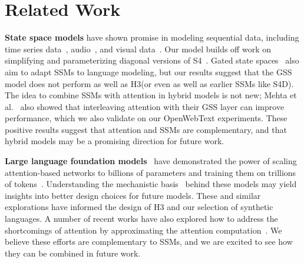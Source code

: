 \documentclass{article}
\newif\ifarxiv
\newcommand{\hthree}{\textsc{H3}\xspace}
\begin{document}
\ifarxiv
 \else

\fi


\appendix
\newpage


\section{Related Work}
\label{sec:related}

\textbf{State space models} have shown promise in modeling sequential data, including time series data~\citep{gu2022efficiently}, audio~\citep{goel2022s}, and visual data~\citep{nguyen2022s4nd}.
Our model builds off work on simplifying and parameterizing diagonal versions of S4~\citep{gu2022parameterization,gupta2022diagonal, gu2022train}.
Gated state spaces~\citep{mehta2022long} also aim to adapt SSMs to language modeling, but our results suggest that the GSS model does not perform as well as \hthree (or even as well as earlier SSMs like S4D).
The idea to combine SSMs with attention in hybrid models is not new; Mehta et al.~\citep{mehta2022long} also showed that interleaving attention with their GSS layer can improve performance, which we also validate on our OpenWebText experiments.
These positive results suggest that attention and SSMs are complementary, and that hybrid models may be a promising direction for future work.

\textbf{Large language foundation models}~\citep{bommasani2021opportunities} have demonstrated the power of scaling attention-based networks to billions of parameters and training them on trillions of tokens~\citep{hoffmann2022training}.
Understanding the mechanistic basis~\citep{elhage2021mathematical} behind these models may yield insights into better design choices for future models.
These and similar explorations have informed the design of \hthree and our selection of synthetic languages.
A number of recent works have also explored how to address the shortcomings of attention by approximating the attention computation~\citep{wang2020linformer,katharopoulos2020transformers, choromanski2020rethinking,tay2020long, kitaev2020reformer, daras2020smyrf}.
We believe these efforts are complementary to SSMs, and we are excited to see how they can be combined in future work.
\end{document}
